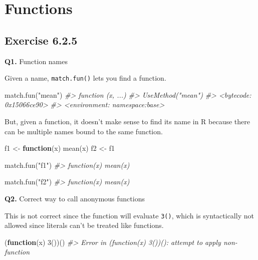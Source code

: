 \documentclass[
]{book}
\newenvironment{Shaded}{\begin{snugshade}}{\end{snugshade}}
\newcommand{\CommentTok}[1]{\textcolor[rgb]{0.56,0.35,0.01}{\textit{#1}}}
\newcommand{\ControlFlowTok}[1]{\textcolor[rgb]{0.13,0.29,0.53}{\textbf{#1}}}
\newcommand{\DecValTok}[1]{\textcolor[rgb]{0.00,0.00,0.81}{#1}}
\newcommand{\FunctionTok}[1]{\textcolor[rgb]{0.00,0.00,0.00}{#1}}
\newcommand{\NormalTok}[1]{#1}
\newcommand{\OtherTok}[1]{\textcolor[rgb]{0.56,0.35,0.01}{#1}}
\newcommand{\StringTok}[1]{\textcolor[rgb]{0.31,0.60,0.02}{#1}}
\begin{document}
\hypertarget{functions}{%
\chapter{Functions}\label{functions}}

\hypertarget{exercise-6.2.5}{%
\section{Exercise 6.2.5}\label{exercise-6.2.5}}

\textbf{Q1.} Function names

Given a name, \texttt{match.fun()} lets you find a function.

\begin{Shaded}
\begin{Highlighting}[]
\FunctionTok{match.fun}\NormalTok{(}\StringTok{"mean"}\NormalTok{)}
\CommentTok{\#\textgreater{} function (x, ...) }
\CommentTok{\#\textgreater{} UseMethod("mean")}
\CommentTok{\#\textgreater{} \textless{}bytecode: 0x15066ce90\textgreater{}}
\CommentTok{\#\textgreater{} \textless{}environment: namespace:base\textgreater{}}
\end{Highlighting}
\end{Shaded}

But, given a function, it doesn't make sense to find its name in R because there can be multiple names bound to the same function.

\begin{Shaded}
\begin{Highlighting}[]
\NormalTok{f1 }\OtherTok{\textless{}{-}} \ControlFlowTok{function}\NormalTok{(x) }\FunctionTok{mean}\NormalTok{(x)}
\NormalTok{f2 }\OtherTok{\textless{}{-}}\NormalTok{ f1}

\FunctionTok{match.fun}\NormalTok{(}\StringTok{"f1"}\NormalTok{)}
\CommentTok{\#\textgreater{} function(x) mean(x)}

\FunctionTok{match.fun}\NormalTok{(}\StringTok{"f2"}\NormalTok{)}
\CommentTok{\#\textgreater{} function(x) mean(x)}
\end{Highlighting}
\end{Shaded}

\textbf{Q2.} Correct way to call anonymous functions

This is not correct since the function will evaluate \texttt{3()}, which is syntactically not allowed since literals can't be treated like functions.

\begin{Shaded}
\begin{Highlighting}[]
\NormalTok{(}\ControlFlowTok{function}\NormalTok{(x) }\DecValTok{3}\NormalTok{())()}
\CommentTok{\#\textgreater{} Error in (function(x) 3())(): attempt to apply non{-}function}
\end{Highlighting}
\end{Shaded}
\end{document}
